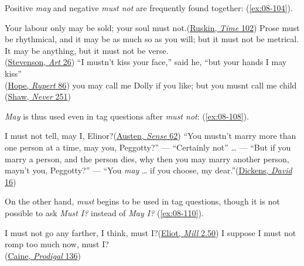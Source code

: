 Positive \textit{may} and negative \textit{must not} are frequently found together: (\ref{ex:08-104}).

\ea \label{ex:08-104}
\ea
Your labour only may be sold; your soul must not.\hfill(\href{https://archive.org/details/afs9348.0001.001.umich.edu/page/93/mode/2up?view=theater&q=%22Your+labour+only+may+be+sold%22}{Ruskin, \textit{Time} 102})
\ex
Prose must be rhythmical, and it may be as much so as you will; but it must not be metrical. It may be anything, but it must not be verse.\\\hfill(\href{https://archive.org/details/essaysinartofwri00stevuoft/page/26/mode/2up?view=theater&q=%22rhythmical%22}{Stevenson, \textit{Art} 26}) %
\ex
``I mustn't kiss your face,'' said he, ``but your hands I may kiss''\\\hfill(\href{https://archive.org/details/in.ernet.dli.2015.53170/page/n111/mode/2up?q=%22kiss+your+face%22&view=theater}{Hope, \textit{Rupert} 86}) %
\ex
you may call me Dolly if you like; but you musnt call me child\\\hfill(\href{https://archive.org/details/dli.ministry.09828/page/251/mode/2up?q=%22may+call+me%22&view=theater}{Shaw, \textit{Never} 251})
\z
\z

\textit{May} is thus used even in tag questions after \textit{must not}: (\ref{ex:08-108}).

\ea \label{ex:08-108}
\ea
I must not tell, may I, Elinor?\hfill(\href{https://archive.org/details/sensesensibility00austrich/page/50/mode/2up?q=%22must+not+tell%22&view=theater}{Austen, \textit{Sense} 62})
\ex
``You mustn't marry more than one person at a time, may you, Peggotty?'' --- ``Certainly not'' {\dots} --- ``But if you marry a person, and the person dies, why then you may marry another person, mayn't you, Peggotty?'' --- ``You \emph{may} {\dots} if you choose, my dear.''\hfill(\href{https://archive.org/details/personalhistory05dickgoog/page/n13/mode/2up?q=%22marry+more%22&view=theater}{Dickens, \textit{David} 16}) %
\z
\z

On the other hand, \textit{must} begins to be used in tag questions, though it is not possible to ask \textit{Must I?} instead of \textit{May I?} (\ref{ex:08-110}).

\ea \label{ex:08-110}
\ea
I must not go any farther, I think, must I?\hfill(\href{https://archive.org/details/millonfloss0009geor/page/328/mode/2up?q=%22must+not+go%22&view=theater}{Eliot, \textit{Mill} 2.50}) %
\ex
I suppose I must not romp too much now, must I?\\\hfill(\href{https://archive.org/details/prodigalson00caingoog/page/n144/mode/2up?view=theater&q=%22romp+too+much%22}{Caine, \textit{Prodigal} 136})
\z
\z
{}

